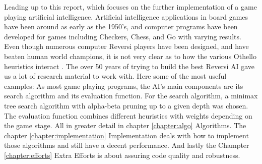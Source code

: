 Leading up to this report, which focuses on the further implementation of a game playing artificial intelligence. Artificial intelligence applications in board games have been around as early as the 1950’s, and computer programs have been developed for games including Checkers, Chess, and Go with varying results. Even though numerous computer Reversi players have been designed, and have beaten human world champions, it is not very clear as to how the various Othello heuristics interact \cite{Analysis}. The over 50 years of trying to build the best Reversi AI gave us a lot of research material to work with. Here some of the most useful examples:\cite{LEE199021} \cite{Frankland} \cite{2007} \newline As most game playing programs, the AI’s main components are its search algorithm and its evaluation function.\cite{Caesar} For the search algorithm, a minimax tree search algorithm with alpha-beta pruning up to a given depth was chosen. The evaluation function combines different heuristics with weights depending on the game stage. All in greater detail in chapter \ref{chapter:algo} Algorithms. The chapter \ref{chapter:implementation} Implementation deals with how to implement those algorithms and still have a decent performance. And lastly the Champter \ref{chapter:efforts} Extra Efforts is about assuring code quality and robustness.


